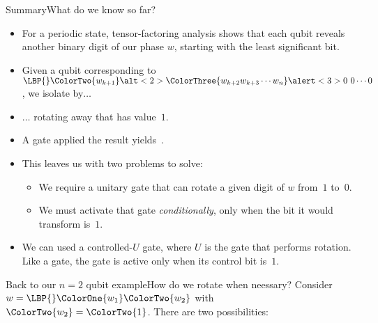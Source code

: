 \begin{frame}{Summary}{What do we know so far?}

\begin{itemize}[<+->]
    \item For a periodic state, tensor-factoring analysis shows that each qubit reveals another binary digit of our phase $w$, starting with the least significant bit.
    \item Given a qubit corresponding to
     $\LBP{}\ColorTwo{w_{k+1}}\alt<2>{\ColorThree{w_{k+2}w_{k+3}\cdots w_{n}}}{\alert<3>{0\ 0\cdots 0}}$,
    we isolate  by$\ldots$
    \item $\ldots$ rotating away  that has value~$1$.  
    \item A \Hadamard{} gate applied the result yields~.
    \item This leaves us with two problems to solve:
    \begin{itemize}
       \item We require a unitary gate that can rotate a given digit of $w$ from~$1$ to~$0$.
       \item We must activate that gate \emph{conditionally}, only when the bit it would transform is~$1$.
    \end{itemize}
    \item We can used a controlled-$U$ gate, where $U$ is the gate that performs rotation.  Like a  gate, the gate is active only when its control bit is~$1$.
\end{itemize}
    
\end{frame}

\begin{frame}{Back to our $n=2$ qubit example}{How do we rotate when neessary?}
Consider $w=\LBP{}\ColorOne{w_1}\ColorTwo{w_2}$ with $\ColorTwo{w_{2}}=\ColorTwo{1}$.  There are two possibilities:
    
\end{frame}

